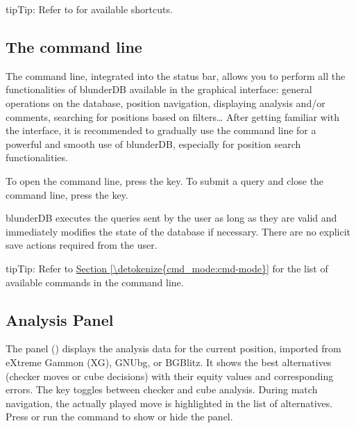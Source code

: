 \documentclass[letterpaper,10pt,english]{sphinxmanual}
\begin{document}
\begin{sphinxadmonition}{tip}{Tip:}
\sphinxAtStartPar
Refer to {\hyperref[\detokenize{raccourcis:raccourcis}]{}} for available shortcuts.
\end{sphinxadmonition}


\subsection{The command line}
\label{\detokenize{manuel:la-ligne-de-commande}}\label{\detokenize{manuel:ligne-commande}}
\sphinxAtStartPar
The command line, integrated into the status bar, allows you to perform all the functionalities of blunderDB available in the graphical interface: general operations on the database, position navigation, displaying analysis and/or comments, searching for positions based on filters… After getting familiar with the interface, it is recommended to gradually use the command line for a powerful and smooth use of blunderDB, especially for position search functionalities.

\sphinxAtStartPar
To open the command line, press the  key. To submit a query and close the command line, press the  key.

\sphinxAtStartPar
blunderDB executes the queries sent by the user as long as they are valid and immediately modifies the state of the database if necessary. There are no explicit save actions required from the user.

\begin{sphinxadmonition}{tip}{Tip:}
\sphinxAtStartPar
Refer to \hyperref[\detokenize{cmd_mode:cmd-mode}]{Section \ref{\detokenize{cmd_mode:cmd-mode}}} for the list of available commands in the command line.
\end{sphinxadmonition}


\subsection{Analysis Panel}
\label{\detokenize{manuel:panneau-analyse}}\label{\detokenize{manuel:id3}}
\sphinxAtStartPar
The  panel () displays the analysis data for the current position, imported from eXtreme Gammon (XG), GNUbg, or BGBlitz. It shows the best alternatives (checker moves or cube decisions) with their equity values and corresponding errors. The  key toggles between checker and cube analysis. During match navigation, the actually played move is highlighted in the list of alternatives. Press  or run the  command to show or hide the panel.
\end{document}
